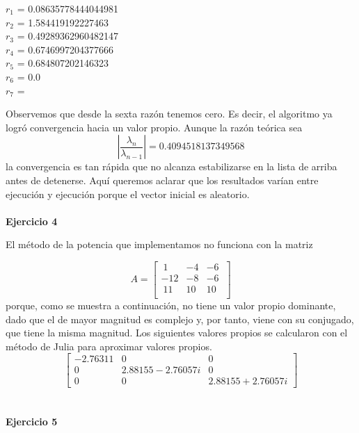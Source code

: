 \documentclass[11pt]{article}
\begin{document}
\begin{multicols}{3}
\noindent
$ r_{1} $ = 0.08635778444044981 \\
$ r_{2} $ = 1.584419192227463 \\
$ r_{3} $ = 0.49289362960482147 \\
$ r_{4} $ = 0.6746997204377666 \\
$ r_{5} $ =  0.684807202146323 \\
$ r_{6} $ = 0.0 \\
$ r_{7} $ =  \\
\end{multicols}

Observemos que desde la sexta razón tenemos cero. Es decir, el algoritmo
ya logró convergencia hacia un valor propio. Aunque la razón teórica sea $$
\left| \frac{\lambda_n}{\lambda_{n-1}} \right| = 0.4094518137349568
$$ la convergencia es tan rápida que no alcanza estabilizarse en la lista de
arriba antes de detenerse.
Aquí queremos aclarar que los resultados varían entre ejecución y ejecución
porque el vector inicial es aleatorio.
\\
\\

\newpage
\noindent
\textbf{Ejercicio 4}

\noindent
El método de la potencia que implementamos no funciona con la matriz

$$
A =
\begin{bmatrix}
 \ 1 & -4 & -6 \ \\
-12 & -8 & -6 \ \\
 \ 11 & 10 & 10 \ \\
\end{bmatrix}
$$
porque, como se muestra a continuación, no tiene un valor propio dominante, dado que el de mayor magnitud es complejo y, por tanto, viene con su conjugado, que tiene la misma magnitud. Los siguientes valores propios se calcularon con el método de Julia para aproximar valores propios.
$$
\begin{bmatrix}
 -2.76311 & 0 & 0 \\
 0 & 2.88155-2.76057i & 0 \\
 0 & 0 & 2.88155+2.76057i
\end{bmatrix}
$$
\\
\\

\newpage
\noindent
\textbf{Ejercicio 5}
\end{document}
